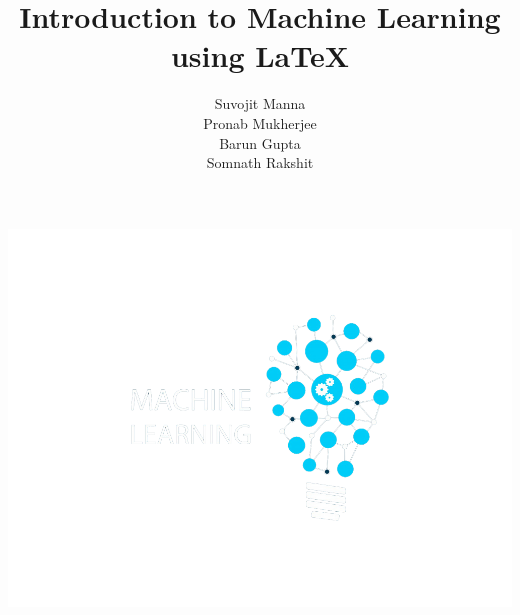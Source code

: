 \documentclass[10pt]{beamer}
\begin{document}
\author[Group 9]{Suvojit Manna\\Pronab Mukherjee\\Barun Gupta\\Somnath Rakshit\\}
\title[Machine Learning]{Introduction to Machine Learning using \LaTeX}


\begingroup
{}
\begin{frame}[plain,t]
	\hspace*{-22 mm}
	\includegraphics[width=\paperwidth,height=\paperheight]{images/ml_bg}
\end{frame}
\endgroup
\end{document}
